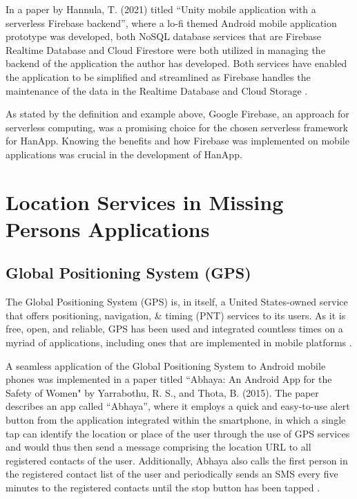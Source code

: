 In a paper by Hannula, T. (2021) titled “Unity mobile application with a serverless Firebase backend”, where a lo-fi themed Android mobile application prototype was developed, both NoSQL database services that are Firebase Realtime Database and Cloud Firestore were both utilized in managing the backend of the application the author has developed. Both services have enabled the application to be simplified and streamlined as Firebase handles the maintenance of the data in the Realtime Database and Cloud Storage \cite{hannula2021unity}.

As stated by the definition and example above, Google Firebase, an approach for serverless computing, was a promising choice for the chosen serverless framework for HanApp. Knowing the benefits and how Firebase was implemented on mobile applications was crucial in the development of HanApp.


\section{Location Services in Missing Persons Applications}

\subsection{Global Positioning System (GPS)}

The Global Positioning System (GPS) is, in itself, a United States-owned service that offers positioning, navigation, \& timing (PNT) services to its users. As it is free, open, and reliable, GPS has been used and integrated countless times on a myriad of applications, including ones that are implemented in mobile platforms \cite{gpsGov}.

A seamless application of the Global Positioning System to Android mobile phones was implemented in a paper titled ``Abhaya: An Android App for the Safety of Women" by Yarrabothu, R. S., and Thota, B. (2015). The paper describes an app called “Abhaya”, where it employs a quick and easy-to-use alert button from the application integrated within the smartphone, in which a single tap can identify the location or place of the user through the use of GPS services and would thus then send a message comprising the location URL to all registered contacts of the user. Additionally, Abhaya also calls the first person in the registered contact list of the user and periodically sends an SMS every five minutes to the registered contacts until the stop button has been tapped \cite{yarrabothu2015abhaya}.

